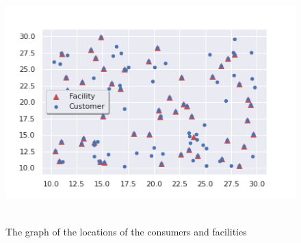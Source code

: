 \documentclass[12pt]{article}
\begin{document}
\begin{figure}[ht] 
    \centering
    \includegraphics[height=25em]{ala_euclidean_2.png}
    \caption{The graph of the locations of the consumers and facilities}
\end{figure}
\end{document}
